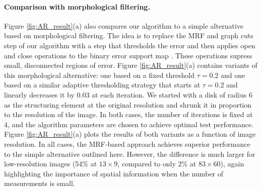 \paragraph{Comparison with morphological filtering.}
Figure \ref{fig:AR_result}(a) also compares our algorithm to a simple alternative based on morphological filtering. The idea is to replace the MRF and graph cuts step of our algorithm with a step that thresholds the error and then applies open and close operations to the binary error support map \cite{morph}. These operations supress small, disconnected regions of error. Figure \ref{fig:AR_result}(a) contains variants of this morphological alternative: one based on a fixed threshold $\tau = 0.2$ and one based on a similar adaptive thresholding strategy that starts at $\tau = 0.2$ and linearly decreases it by $0.03$ at each iteration. We started with a disk of radius 6 as the structuring element at the original resolution and shrunk it in proportion to the resolution of the image. In both cases, the number of iterations is fixed at 4, and the algorithm parameters are chosen to achieve optimal test performance. Figure \ref{fig:AR_result}(a) plots the results of both variants as a function of image resolution. In all cases, the MRF-based approach achieves superior performance to the simple alternative outlined here. However, the difference is much larger for low-resolution images (54\% at $13\times 9$, compared to only 2\% at $83 \times 60$), again highlighting the importance of spatial information when the number of measurements is small.\vspace{0mm}
